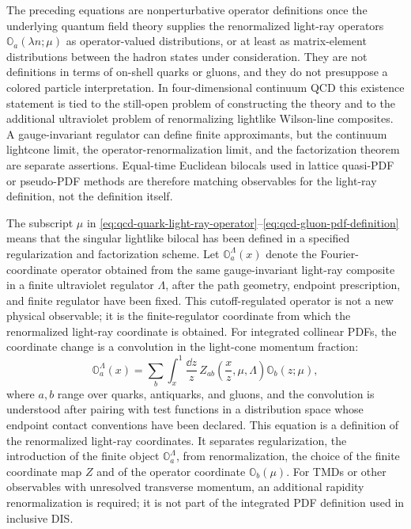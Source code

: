 The preceding equations are nonperturbative operator definitions once the
underlying quantum field theory supplies the renormalized light-ray operators
\(\mathbb O_a(\lambda n;\mu)\) as operator-valued distributions, or at least as
matrix-element distributions between the hadron states under consideration.
They are not definitions in terms of on-shell quarks or gluons, and they do not
presuppose a colored particle interpretation.  In four-dimensional continuum
QCD this existence statement is tied to the still-open problem of constructing
the theory and to the additional ultraviolet problem of renormalizing lightlike
Wilson-line composites.  A gauge-invariant regulator can define finite
approximants, but the continuum lightcone limit, the operator-renormalization
limit, and the factorization theorem are separate assertions.  Equal-time
Euclidean bilocals used in lattice quasi-PDF or pseudo-PDF methods are therefore
matching observables for the light-ray definition, not the definition itself.

The subscript \(\mu\) in
\eqref{eq:qcd-quark-light-ray-operator}--\eqref{eq:qcd-gluon-pdf-definition}
means that the singular lightlike bilocal has been defined in a specified
regularization and factorization scheme.  Let
\(\mathbb O_a^\Lambda(x)\) denote the Fourier-coordinate operator obtained
from the same gauge-invariant light-ray composite in a finite ultraviolet
regulator \(\Lambda\), after the path geometry, endpoint prescription, and
finite regulator have been fixed.  This cutoff-regulated operator is not a
new physical observable; it is the finite-regulator coordinate from which the
renormalized light-ray coordinate is obtained.  For integrated collinear PDFs,
the coordinate change is a convolution in the light-cone momentum fraction:
\begin{equation}
  \mathbb O^{\Lambda}_{a}(x)
  =
  \sum_b
  \int_x^1\frac{\dd z}{z}\,
  Z_{ab}\!\left(\frac{x}{z},\mu,\Lambda\right)
  \mathbb O_b(z;\mu),
  \label{eq:qcd-light-ray-renormalization-convolution}
\end{equation}
where \(a,b\) range over quarks, antiquarks, and gluons, and the convolution
is understood after pairing with test functions in a distribution space whose
endpoint contact conventions have been declared.  This equation is a
definition of the renormalized light-ray coordinates.  It separates
regularization, the introduction of the finite object
\(\mathbb O_a^\Lambda\), from renormalization, the choice of the finite
coordinate map \(Z\) and of the operator coordinate \(\mathbb O_b(\mu)\).
For TMDs or other observables with unresolved transverse momentum, an
additional rapidity renormalization is required; it is not part of the
integrated PDF definition used in inclusive DIS.

